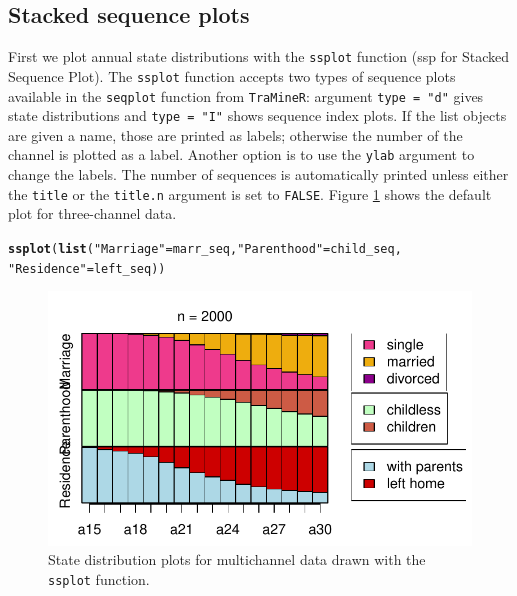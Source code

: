 \documentclass[12pt]{article}\usepackage[]{graphicx}\usepackage[]{color}
\makeatletter
\def\maxwidth{ %
  \ifdim\Gin@nat@width>\linewidth
    \linewidth
  \else
    \Gin@nat@width
  \fi
}
\newcommand{\hlstr}[1]{\textcolor[rgb]{0.192,0.494,0.8}{#1}}%
\newcommand{\hlstd}[1]{\textcolor[rgb]{0.345,0.345,0.345}{#1}}%
\newcommand{\hlkwd}[1]{\textcolor[rgb]{0.737,0.353,0.396}{\textbf{#1}}}%
\newenvironment{kframe}{%
 \def\at@end@of@kframe{}%
 \ifinner\ifhmode%
  \def\at@end@of@kframe{\end{minipage}}%
  \begin{minipage}{\columnwidth}%
 \fi\fi%
 \def\FrameCommand##1{\hskip\@totalleftmargin \hskip-\fboxsep
 \colorbox{shadecolor}{##1}\hskip-\fboxsep
     \hskip-\linewidth \hskip-\@totalleftmargin \hskip\columnwidth}%
 \MakeFramed {\advance\hsize-\width
   \@totalleftmargin\z@ \linewidth\hsize
   \@setminipage}}%
 {\par\unskip\endMakeFramed%
 \at@end@of@kframe}
\newenvironment{knitrout}{}{} %
\makeatother
\begin{document}
\subsection{Stacked sequence plots}

First we plot annual state distributions with the \texttt{ssplot} function (ssp for Stacked Sequence Plot). The \texttt{ssplot} function accepts two types of sequence plots available in the \texttt{seqplot} function from \texttt{TraMineR}: argument \texttt{type = "d"} gives state distributions and \texttt{type = "I"} shows sequence index plots. If the list objects are given a name, those are printed as labels; otherwise the number of the channel is plotted as a label. Another option is to use the \texttt{ylab} argument to change the labels. The number of sequences is automatically printed unless either the \texttt{title} or the \texttt{title.n} argument is set to \texttt{FALSE}. Figure \ref{fig:plotd} shows the default plot for three-channel data.

\begin{knitrout}
\color{fgcolor}\begin{kframe}
\begin{alltt}
\hlkwd{ssplot}\hlstd{(}\hlkwd{list}\hlstd{(}\hlstr{"Marriage"} \hlstd{= marr_seq,} \hlstr{"Parenthood"} \hlstd{= child_seq,}
       \hlstr{"Residence"} \hlstd{= left_seq))}
\end{alltt}
\end{kframe}\begin{figure}

{\centering \includegraphics[width=\maxwidth]{figure/plotd-1} 

}

\caption[State distribution plots for multichannel data drawn with the \texttt{ssplot} function]{State distribution plots for multichannel data drawn with the \texttt{ssplot} function.}\label{fig:plotd}
\end{figure}


\end{knitrout}
\end{document}
